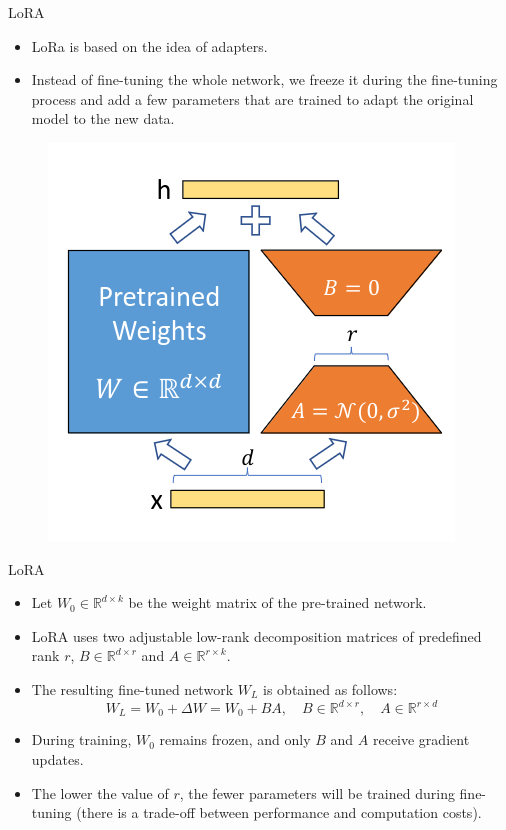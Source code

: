 \documentclass[handout]{beamer}
\begin{document}
\begin{frame}{LoRA}
\begin{scriptsize}
\begin{itemize}
    \item LoRa is based on the idea of adapters.
\item Instead of fine-tuning the whole network, we freeze it during the fine-tuning process and add a few parameters that are trained to adapt the original model to the new data.
          \end{itemize}

      \begin{figure}[h]
	\includegraphics[scale = 0.35]{pics/lora.png}
\end{figure}

\end{scriptsize}
\end{frame}


\begin{frame}{LoRA}
\begin{scriptsize}
\begin{itemize}
        \item Let $W_0 \in \mathbb{R}^{d \times k}$ be the weight matrix of the pre-trained network.
    \item LoRA uses two adjustable low-rank decomposition matrices of predefined rank $r$, \(B \in \mathbb{R}^{d \times r}\) and \(A \in \mathbb{R}^{r \times k}\).
    \item The resulting fine-tuned network $W_L$ is obtained as follows:
      \begin{equation}
    W_L = W_0 + \Delta W = W_0 + BA, \quad B \in \mathbb{R}^{d \times r}, \quad A \in \mathbb{R}^{r \times d}
  \end{equation}
 \item During training, \(W_0\) remains frozen, and only \(B\) and \(A\) receive gradient updates.
 \item The lower the value of $r$, the fewer parameters will be trained during fine-tuning (there is a trade-off between performance and computation costs).
      \end{itemize}

\end{scriptsize}
\end{frame}
\end{document}
